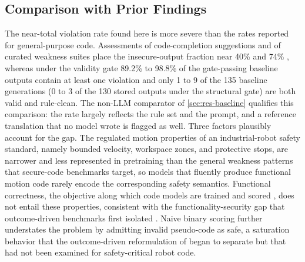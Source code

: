 \documentclass{ieeeaccess}
\begin{document}
\subsection{Comparison with Prior Findings}\label{sec:comparison}
The near-total violation rate found here is more severe than the rates reported for
general-purpose code. Assessments of code-completion suggestions and of curated weakness
suites place the insecure-output fraction near 40\% \cite{ref5} and 74\% \cite{ref6},
whereas under the validity gate 89.2\% to 98.8\% of the gate-passing baseline outputs contain
at least one violation and only 1 to 9 of the 135 baseline generations (0 to 3 of the 130
stored outputs under the structural gate) are both valid and rule-clean. The non-LLM
comparator of \ref{sec:res-baseline} qualifies this comparison: the rate largely reflects
the rule set and the prompt, and a reference translation that no model wrote is flagged as
well. Three factors
plausibly account for the gap. The regulated motion properties of an industrial-robot
safety standard, namely bounded velocity, workspace zones, and protective stops, are
narrower and less represented in pretraining than the general weakness patterns that
secure-code benchmarks target, so models that fluently produce functional motion code
rarely encode the corresponding safety semantics. Functional correctness, the objective
along which code models are trained and scored \cite{ref13, ref14}, does not entail these
properties, consistent with the functionality-security gap that outcome-driven benchmarks
first isolated \cite{ref7}. Naive binary scoring further understates the problem by
admitting invalid pseudo-code as safe, a saturation behavior that the outcome-driven
reformulation of \cite{ref7} began to separate but that had not been examined for
safety-critical robot code.
\end{document}
